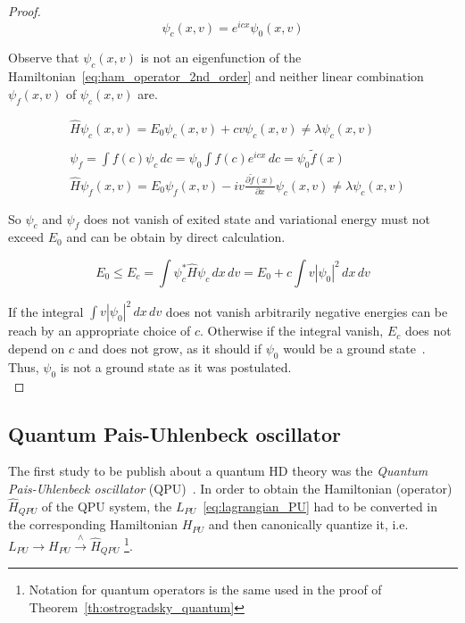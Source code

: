 \begin{proof}
  \begin{equation}
    \psi_c(x, v) = e^{icx}\psi_0(x,v)
  \end{equation}

  Observe that $\psi_c(x,v)$ is not an eigenfunction of the
  Hamiltonian~\eqref{eq:ham_operator_2nd_order} and neither linear combination
  $\psi_f(x,v)$ of $\psi_c(x,v)$ are.

  \begin{align*}
    &\hat{H} \psi_c(x,v) = E_0\psi_c(x, v) + cv \psi_c(x,v)
    \neq \lambda \psi_c(x,v) \\ \\
    &\psi_f = \int f(c) \psi_c \, dc = \psi_0 \int f(c) e^{icx} \, dc =
    \psi_0 \tilde{f}(x) \\
    &\hat{H} \psi_f(x,v) = E_0\psi_f(x, v) -
    iv \frac{\partial \tilde{f}(x)}{\partial x} \psi_c(x,v)
    \neq \lambda \psi_c(x,v)
  \end{align*}

  So $\psi_c$ and $\psi_f$ does not vanish of exited state and variational
  energy must not exceed $E_0$ and can be obtain by direct calculation.

  \begin{equation*}
    E_0 \leq E_c = \int \psi_c^* \hat{H} \psi_c \, dx \, dv =
    E_0 + c \int v \left|\psi_0 \right| ^2 \, dx \, dv
  \end{equation*}

  If the integral $\int v \left|\psi_0 \right| ^2 \, dx \, dv$ does not vanish
  arbitrarily negative energies can be reach by an appropriate choice of $c$.
  Otherwise if the integral vanish, $E_c$ does not depend on $c$ and does not
  grow, as it should if $\psi_0$ would be a ground state~\cite{Smilga17}. Thus,
  $\psi_0$ is not a ground state as it was postulated. \\
\end{proof}


\subsection{Quantum Pais-Uhlenbeck oscillator}
The first study to be publish about a quantum HD theory was the \emph{Quantum
Pais-Uhlenbeck oscillator} (QPU)~\cite{PU50}. In order to obtain the Hamiltonian
(operator) $\hat{H}_{QPU}$ of the QPU system,
the $L_{PU}$~\eqref{eq:lagrangian_PU} had to be converted in the corresponding
Hamiltonian $H_{PU}$ and then canonically quantize it, i.e.
$L_{PU} \rightarrow H_{PU} \xrightarrow{\wedge} \hat{H}_{QPU}$
\footnote{
  Notation for quantum operators is
  the same used in the proof of Theorem~\ref{th:ostrogradsky_quantum}
}.

